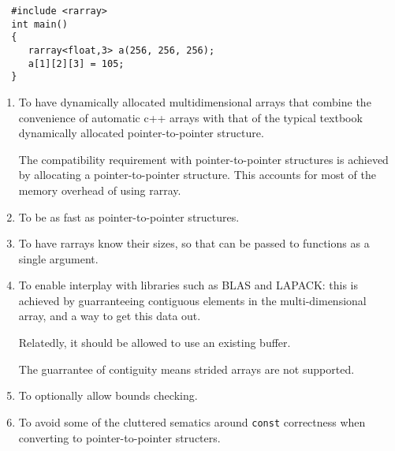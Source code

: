 \documentclass[11pt,twoside]{article}
\begin{document}
\begin{framed}\vspace{-14pt}%
\begin{verbatim}
  #include <rarray>
  int main() 
  {
     rarray<float,3> a(256, 256, 256);
     a[1][2][3] = 105;
  }
\end{verbatim}%
\vspace{-14pt}%
\end{framed}


\begin{enumerate}\itemsep1pt\parskip3pt
 
\item To have dynamically allocated multidimensional arrays that
combine the convenience of automatic c++ arrays with that of the
typical textbook dynamically allocated pointer-to-pointer
structure. 

The compatibility requirement with pointer-to-pointer structures
is achieved by allocating a pointer-to-pointer structure. This
accounts for most of the memory overhead of using rarray.

\item To be as fast as pointer-to-pointer structures.

\item To have rarrays know their sizes, so that can be passed to
functions as a single argument. 

\item To enable interplay with libraries such as BLAS and LAPACK: this
  is achieved by guarranteeing contiguous elements in the
  multi-dimensional array, and a way to get this data out.

Relatedly, it should be allowed to use an existing buffer.
    
The guarrantee of contiguity means strided arrays are not supported.

\item To optionally allow bounds checking.

\item To avoid some of the cluttered sematics around \texttt{const} correctness when converting to pointer-to-pointer structers.
\end{enumerate}
\end{document}
